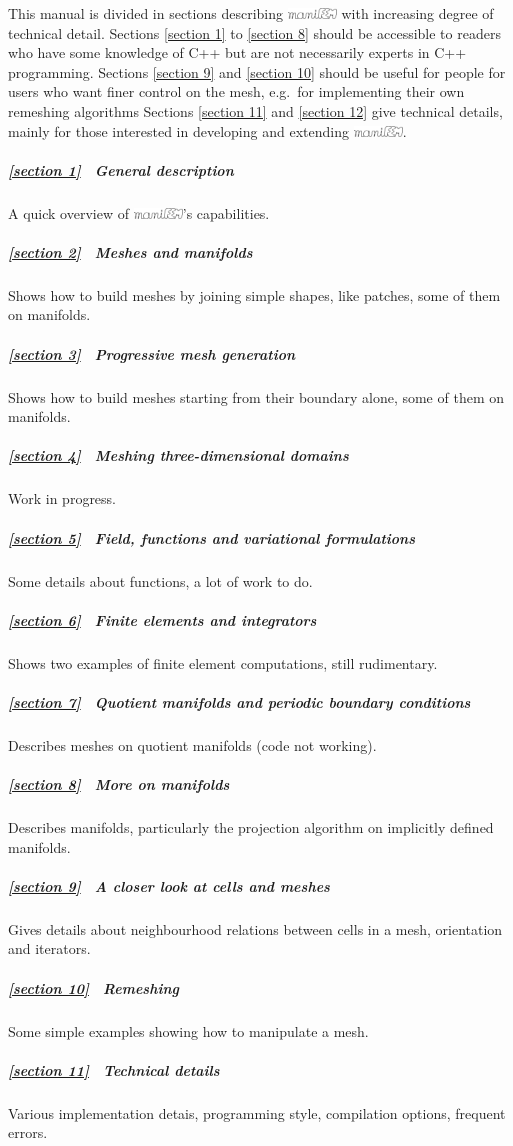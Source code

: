 \documentclass[a4paper]{scrreprt}
\def\numb{}
\newcommand\maniFEM{\leavevmode\hbox{\includegraphics[width=13mm]{manifem-small}}}
\newcommand\cinza[1]{\textcolor{coment}{#1}}
\renewcommand\tt{\normalfont\ttfamily}
\begin{document}
This manual is divided in sections describing {\maniFEM} with increasing degree of technical
detail.
Sections \ref{\numb section 1} to \ref{\numb section 8} should be accessible to readers
who have some knowledge of {\tt C++} but are not necessarily experts in {\tt C++} programming.
Sections \ref{\numb section 9} and \ref{\numb section 10} should be useful for people
for users who want finer control on the mesh,
e.g.\ for implementing their own remeshing algorithms
Sections \ref{\numb section 11} and \ref{\numb section 12} give technical details,
mainly for those interested in developing and extending \maniFEM.

\subparagraph*{\ref{\numb section 1} \ General description}
A quick overview of \maniFEM's capabilities.

\subparagraph*{\ref{\numb section 2} \ Meshes and manifolds}
Shows how to build meshes by joining simple shapes, like patches, some of them on manifolds.

\subparagraph*{\ref{\numb section 3} \ Progressive mesh generation}
Shows how to build meshes starting from their boundary alone, some of them on manifolds.

\subparagraph*{\ref{\numb section 4} \ \cinza{Meshing three-dimensional domains}}
Work in progress.

\subparagraph*{\ref{\numb section 5} \ Field, functions and variational formulations}
Some details about functions, a lot of work to do.

\subparagraph*{\ref{\numb section 6} \ Finite elements and integrators}
Shows two examples of finite element computations, still rudimentary.

\subparagraph*{\ref{\numb section 7} \ \cinza{Quotient manifolds and periodic boundary conditions}}
Describes meshes on quotient manifolds (code not working).

\subparagraph*{\ref{\numb section 8} \ More on manifolds}
Describes manifolds, particularly the projection algorithm on implicitly defined manifolds.

\subparagraph*{\ref{\numb section 9} \ A closer look at cells and meshes}
Gives details about neighbourhood relations between cells in a mesh, orientation and iterators.

\subparagraph*{\ref{\numb section 10} \ Remeshing}
Some simple examples showing how to manipulate a mesh.

\subparagraph*{\ref{\numb section 11} \ Technical details}
Various implementation detais, programming style, compilation options, frequent errors.
\end{document}
